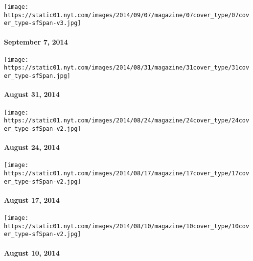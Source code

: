 \href{http://www.nytimes.com/indexes/2014/09/07/magazine/index.html}{}

\texttt{[image: https://static01.nyt.com/images/2014/09/07/magazine/07cover\_type/07cover\_type-sfSpan-v3.jpg]}

\hypertarget{september-7-2014}{%
\paragraph{September 7, 2014}\label{september-7-2014}}

\href{http://www.nytimes.com/indexes/2014/08/31/magazine/index.html}{}

\texttt{[image: https://static01.nyt.com/images/2014/08/31/magazine/31cover\_type/31cover\_type-sfSpan.jpg]}

\hypertarget{august-31-2014}{%
\paragraph{August 31, 2014}\label{august-31-2014}}

\href{http://www.nytimes.com/indexes/2014/08/24/magazine/index.html}{}

\texttt{[image: https://static01.nyt.com/images/2014/08/24/magazine/24cover\_type/24cover\_type-sfSpan-v2.jpg]}

\hypertarget{august-24-2014}{%
\paragraph{August 24, 2014}\label{august-24-2014}}

\href{http://www.nytimes.com/indexes/2014/08/17/magazine/index.html}{}

\texttt{[image: https://static01.nyt.com/images/2014/08/17/magazine/17cover\_type/17cover\_type-sfSpan-v2.jpg]}

\hypertarget{august-17-2014}{%
\paragraph{August 17, 2014}\label{august-17-2014}}

\href{http://www.nytimes.com/indexes/2014/08/10/magazine/index.html}{}

\texttt{[image: https://static01.nyt.com/images/2014/08/10/magazine/10cover\_type/10cover\_type-sfSpan-v2.jpg]}

\hypertarget{august-10-2014}{%
\paragraph{August 10, 2014}\label{august-10-2014}}

